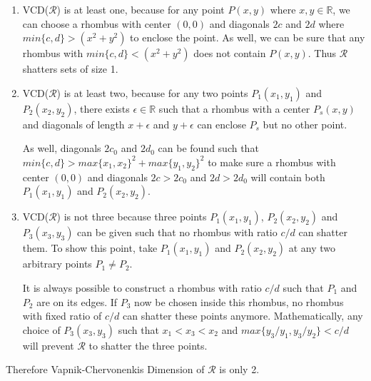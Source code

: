 \begin{enumerate}
\item VCD($\mathcal{R}$) is at least one, because for any point $P(x,y)$ where $x, y \in \mathbb{R}$, we can choose a rhombus with center $(0,0)$ and diagonals $2c$ and $2d$ where $min\{c,d\} > (x^2 + y^2)$ to enclose the point.
As well, we can be sure that any rhombus with $min\{c,d\} < (x^2 + y^2)$ does not contain $P(x,y)$.
Thus $\mathcal{R}$ shatters sets of size 1.

\item VCD($\mathcal{R}$) is at least two, because for any two points $P_1(x_1,y_1)$ and $P_2(x_2,y_2)$, there exists $\epsilon \in \mathbb{R}$ such that a rhombus with a center $P_s(x,y)$ and diagonals of length $x+\epsilon$ and $y+\epsilon$ can enclose $P_s$ but no other point.

As well, diagonals $2c_0$ and $2d_0$ can be found such that $min\{c,d\} > max\{x_1,x_2\}^2 + max\{y_1, y_2\}^2$ to make sure a rhombus with center $(0,0)$ and diagonals $2c > 2c_0$ and $2d > 2d_0$ will contain both $P_1(x_1,y_1)$ and $P_2(x_2,y_2)$.

\item VCD($\mathcal{R}$) is not three because three points $P_1(x_1,y_1)$, $P_2(x_2,y_2)$ and $P_3(x_3,y_3)$ can be given such that no rhombus with ratio $c/d$ can shatter them.
To show this point, take $P_1(x_1,y_1)$ and $P_2(x_2,y_2)$ at any two arbitrary points $P_1 \neq P_2$.

It is always possible to construct a rhombus with ratio $c/d$ such that $P_1$ and $P_2$ are on its edges.
If $P_3$ now be chosen inside this rhombus, no rhombus with fixed ratio of $c/d$ can shatter these points anymore.
Mathematically, any choice of $P_3(x_3,y_3)$ such that $x_1 < x_3 < x_2$ and $max\{y_3/y_1, y_3/y_2\} < c/d$ will prevent $\mathcal{R}$ to shatter the three points.
\end{enumerate}

Therefore Vapnik-Chervonenkis Dimension of $\mathcal{R}$ is only 2.

